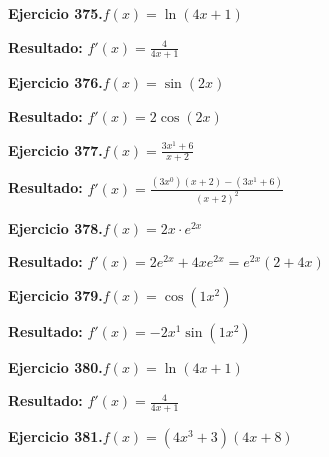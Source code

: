 \documentclass[10pt,a4paper]{article}
\begin{document}
\begin{ejbox}
\textbf{Ejercicio 375.}\quad $f(x) = \ln(4x + 1)$
\end{ejbox}

\begin{solbox}
\textbf{Resultado:} \(\displaystyle f'(x) = \frac{4}{4x + 1}\)
\end{solbox}

\newpage
\begin{ejbox}
\textbf{Ejercicio 376.}\quad $f(x) = \sin(2x)$
\end{ejbox}

\begin{solbox}
\textbf{Resultado:} \(\displaystyle f'(x) = 2\cos(2x)\)
\end{solbox}

\begin{ejbox}
\textbf{Ejercicio 377.}\quad $f(x) = \frac{3x^{1} +6}{x + 2}$
\end{ejbox}

\begin{solbox}
\textbf{Resultado:} \(\displaystyle f'(x) = \frac{(3x^{0})(x+2) - (3x^{1} +6)}{(x+2)^2}\)
\end{solbox}

\begin{ejbox}
\textbf{Ejercicio 378.}\quad $f(x) = 2x \cdot e^{2x}$
\end{ejbox}

\begin{solbox}
\textbf{Resultado:} \(\displaystyle f'(x) = 2e^{2x} + 4xe^{2x} = e^{2x}(2 + 4x)\)
\end{solbox}

\newpage
\begin{ejbox}
\textbf{Ejercicio 379.}\quad $f(x) = \cos(1x^{2})$
\end{ejbox}

\begin{solbox}
\textbf{Resultado:} \(\displaystyle f'(x) = -2x^{1}\sin(1x^{2})\)
\end{solbox}

\begin{ejbox}
\textbf{Ejercicio 380.}\quad $f(x) = \ln(4x + 1)$
\end{ejbox}

\begin{solbox}
\textbf{Resultado:} \(\displaystyle f'(x) = \frac{4}{4x + 1}\)
\end{solbox}

\begin{ejbox}
\textbf{Ejercicio 381.}\quad $f(x) = (4x^{3} +3)(4x +8)$
\end{ejbox}
\end{document}
